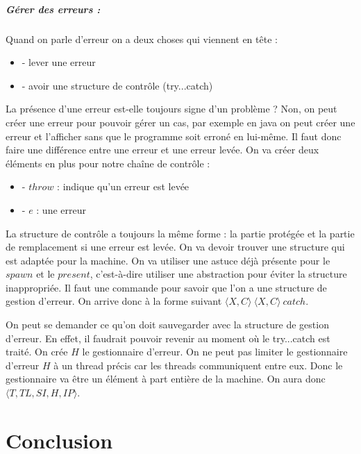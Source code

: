 \documentclass[10pt,a4paper]{report}
\begin{document}
	\paragraph{Gérer des erreurs :} Quand on parle d'erreur on a deux choses qui viennent en tête :
	\begin{itemize}
		\item[] - lever une erreur
		\item[] - avoir une structure de contrôle (try...catch)
	\end{itemize}
	La présence d'une erreur est-elle toujours signe d'un problème ? Non, on peut créer une erreur pour pouvoir gérer un cas, par exemple en java on peut créer une erreur et l'afficher sans que le programme soit erroné en lui-même. Il faut donc faire une différence entre une erreur et une erreur levée. On va créer deux éléments en plus pour notre chaîne de contrôle :
	\begin{itemize}
		\item[] - $throw$ : indique qu'un erreur est levée
		\item[] - $e$ : une erreur
	\end{itemize} 
	La structure de contrôle a toujours la même forme : la partie protégée et la partie de remplacement si une erreur est levée. On va devoir trouver une structure qui est adaptée pour la machine. On va utiliser une astuce déjà présente pour le $spawn$ et le $present$, c'est-à-dire utiliser une abstraction pour éviter la structure inappropriée. Il faut une commande pour savoir que l'on a une structure de gestion d'erreur. On arrive donc à la forme suivant $\langle X,C\rangle~\langle X,C\rangle~catch$.
	\medbreak
	
	On peut se demander ce qu'on doit sauvegarder avec la structure de gestion d'erreur. En effet, il faudrait pouvoir revenir au moment où le try...catch est traité. On crée $H$ le gestionnaire d'erreur. On ne peut pas limiter le gestionnaire d'erreur $H$ à un thread précis car les threads communiquent entre eux. Donc le gestionnaire va être un élément à part entière de la machine. On aura donc $\langle T,TL,SI,H,IP\rangle$.
	
	
	
	
	
	
	
	\chapter{Conclusion}
	
\end{document}
